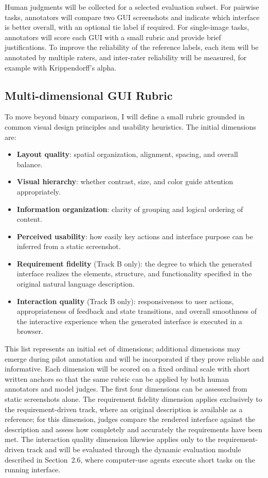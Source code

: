 \documentclass[pdflatex,sn-mathphys-num]{sn-jnl}
\begin{document}
Human judgments will be collected for a selected evaluation subset. For pairwise tasks,
annotators will compare two GUI screenshots and indicate which interface is better
overall, with an optional tie label if required. For single-image tasks, annotators
will score each GUI with a small rubric and provide brief justifications. To improve
the reliability of the reference labels, each item will be annotated by multiple
raters, and inter-rater reliability will be measured, for example with
Krippendorff's alpha.

\subsection{Multi-dimensional GUI Rubric}

To move beyond binary comparison, I will define a small rubric grounded in common
visual design principles and usability heuristics. The initial dimensions are:

\begin{itemize}
    \item \textbf{Layout quality}: spatial organization, alignment, spacing, and
    overall balance.
    \item \textbf{Visual hierarchy}: whether contrast, size, and color guide attention
    appropriately.
    \item \textbf{Information organization}: clarity of grouping and logical ordering
    of content.
    \item \textbf{Perceived usability}: how easily key actions and interface purpose
    can be inferred from a static screenshot.
    \item \textbf{Requirement fidelity} (Track B only): the degree to which the
    generated interface realizes the elements, structure, and functionality specified
    in the original natural language description.
    \item \textbf{Interaction quality} (Track B only): responsiveness to user actions,
    appropriateness of feedback and state transitions, and overall smoothness of the
    interactive experience when the generated interface is executed in a browser.
\end{itemize}

This list represents an initial set of dimensions; additional dimensions may emerge
during pilot annotation and will be incorporated if they prove reliable and
informative. Each dimension will be scored on a fixed ordinal scale with short written
anchors so that the same rubric can be applied by both human annotators and model
judges. The first four dimensions can be assessed from static screenshots alone. The
requirement fidelity dimension applies exclusively to the requirement-driven track,
where an original description is available as a reference; for this dimension, judges
compare the rendered interface against the description and assess how completely and
accurately the requirements have been met. The interaction quality dimension likewise
applies only to the requirement-driven track and will be evaluated through the dynamic
evaluation module described in Section~2.6, where computer-use agents execute short
tasks on the running interface.
\end{document}
